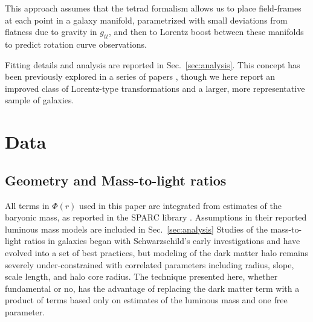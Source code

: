 \documentclass[reprint,%
 amsmath,amssymb,
 aps,
]{revtex4-1}
\begin{document}
  

   
 
 
    
  


This approach    assumes that the tetrad formalism allows us to place field-frames at each point in a galaxy manifold, parametrized with small deviations from flatness due to gravity in $g_{tt}$, and  then to Lorentz boost between these manifolds to predict rotation curve observations. 


  Fitting details and analysis are reported in Sec.~\ref{sec:analysis}. This concept has been previously explored in a series of papers \cite{Cisneros:2013vha,Cisneros:2014fea,Cisneros2015,Cisn2016}, though we here report an improved class of Lorentz-type transformations and a larger, more representative sample of galaxies. 
   
 


  
 


 

\section{Data \label{sec:data}}
%  
\subsection{Geometry and Mass-to-light ratios}
 All terms in $\Phi(r)$ used in this paper  are    integrated from estimates of the baryonic mass, as reported in the      SPARC  library \cite{2016Lelli}.  
   Assumptions in their reported luminous mass models  are included in Sec.~\ref{sec:analysis}
Studies of the mass-to-light ratios in galaxies began with Schwarzschild's early investigations \cite{1954AJ.....59..273S} and have evolved into a set of best practices, but modeling of the 
dark matter halo remains severely   under-constrained with correlated parameters including radius, slope, scale length, and halo core radius.     
The technique presented here, whether fundamental or no,  has the advantage of replacing the dark matter term  with a product of terms based only on estimates of the luminous mass and   one free parameter.
\end{document}
